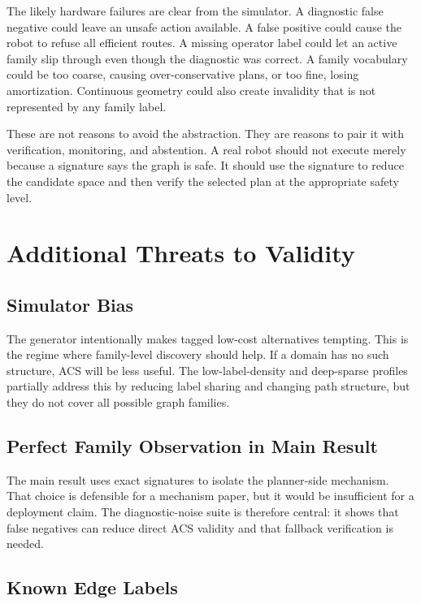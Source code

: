\documentclass{article}
\newcommand{\ACS}{\textsc{ACS}}
\begin{document}
The likely hardware failures are clear from the simulator. A diagnostic false negative could leave an unsafe action available. A false positive could cause the robot to refuse all efficient routes. A missing operator label could let an active family slip through even though the diagnostic was correct. A family vocabulary could be too coarse, causing over-conservative plans, or too fine, losing amortization. Continuous geometry could also create invalidity that is not represented by any family label.

These are not reasons to avoid the abstraction. They are reasons to pair it with verification, monitoring, and abstention. A real robot should not execute merely because a signature says the graph is safe. It should use the signature to reduce the candidate space and then verify the selected plan at the appropriate safety level.

\section{Additional Threats to Validity}

\subsection{Simulator Bias}

The generator intentionally makes tagged low-cost alternatives tempting. This is the regime where family-level discovery should help. If a domain has no such structure, \ACS{} will be less useful. The low-label-density and deep-sparse profiles partially address this by reducing label sharing and changing path structure, but they do not cover all possible graph families.

\subsection{Perfect Family Observation in Main Result}

The main result uses exact signatures to isolate the planner-side mechanism. That choice is defensible for a mechanism paper, but it would be insufficient for a deployment claim. The diagnostic-noise suite is therefore central: it shows that false negatives can reduce direct \ACS{} validity and that fallback verification is needed.

\subsection{Known Edge Labels}
\end{document}
